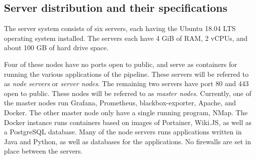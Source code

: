 \subsection{Server distribution and their specifications}
The \knox{} server system consists of six servers, each having the Ubuntu 18.04 LTS operating system installed. The servers each have 4 GiB of RAM, 2 vCPUs, and about 100 GB of hard drive space. 

Four of these nodes have no ports open to public, and serve as containers for running the various applications of the \knox{} pipeline.
These servers will be referred to as \textit{node servers} or \textit{server nodes}. The remaining two servers have port 80 and 443 open to public. These nodes will be referred to as \textit{master nodes}.
Currently, one of the master nodes run Grafana, Prometheus, blackbox-exporter, Apache, and Docker. The other master node only have a single running program, NMap.
The Docker instance runs containers based on images of Portainer, Wiki.JS, as well as a PostgreSQL database.
Many of the node servers runs applications written in Java and Python, as well as databases for the applications. 
No firewalls are set in place between the servers.

